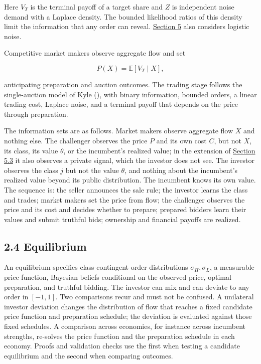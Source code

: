 Here \(V_T\) is the terminal payoff of a target share and \(Z\) is
independent noise demand with a Laplace density. The bounded likelihood
ratios of this density limit the information that any order can reveal.
\hyperref[sec-extensions]{Section 5} also considers logistic noise.

Competitive market makers observe aggregate flow and set

\[
P(X)=\mathbb E[V_T\mid X],
\tag{3}\label{eq:paper-3}
\]

anticipating preparation and auction outcomes. The trading stage follows the single-auction model of Kyle (), with binary information, bounded orders, a linear trading cost, Laplace noise, and a terminal payoff that depends on the price through preparation.


The information sets are as follows. Market makers observe aggregate
flow \(X\) and nothing else. The challenger observes the price \(P\) and
its own cost \(C\), but not \(X\), its class, its value \(\theta\), or
the incumbent's realized value; in the extension of
\hyperref[sec-complementary-private-information]{Section 5.3} it also
observes a private signal, which the investor does not see. The investor
observes the class \(j\) but not the value \(\theta\), and nothing about
the incumbent's realized value beyond its public distribution. The
incumbent knows its own value. The sequence is: the seller announces the
sale rule; the investor learns the class and trades; market makers set
the price from flow; the challenger observes the price and its cost and
decides whether to prepare; prepared bidders learn their values and
submit truthful bids; ownership and financial payoffs are realized.

\subsection{2.4 Equilibrium}\label{sec-equilibrium}

An equilibrium specifies class-contingent order distributions
\(\sigma_H,\sigma_L\), a measurable price function, Bayesian beliefs
conditional on the observed price, optimal preparation, and truthful
bidding. The investor can mix and can deviate to any order in
\([-1,1]\). Two comparisons recur and must not be confused. A unilateral
investor deviation changes the distribution of flow that reaches a fixed
candidate price function and preparation schedule; the deviation is
evaluated against those fixed schedules. A comparison across economies,
for instance across incumbent strengths, re-solves the price function
and the preparation schedule in each economy. Proofs and validation
checks use the first when testing a candidate equilibrium and the second
when comparing outcomes.

